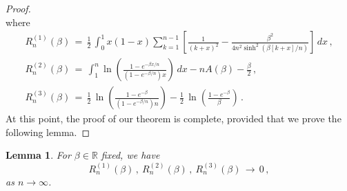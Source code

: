 \documentclass[12pt]{report}
\newtheorem{lemma}[theorem]{Lemma}
\theoremstyle{definition}
\begin{document}
\begin{proof}
$$$$
where
\begin{gather*}
R_n^{(1)}(\beta)\, =\, \frac{1}{2}\,\int_0^1 x(1-x)  \sum_{k=1}^{n-1} \left[\frac{1}{(k+x)^2} - \frac{\beta^2}{4 n^2 \sinh^2(\beta[k+x]/n)}\right]\, dx\, ,\\
R_n^{(2)}(\beta)\, 
=\, \int_1^n \ln\left(\frac{1-e^{-\beta x/n}}{(1-e^{-\beta/n})x}\right)\, dx - n A(\beta) - \frac{\beta}{2}\, ,\\
R_n^{(3)}(\beta)\, 
=\,  \frac{1}{2}\, \ln\left(\frac{1-e^{-\beta}}{(1-e^{-\beta/n})n}\right) - \frac{1}{2}\, \ln\left( \frac{1-e^{-\beta}}{\beta} \right)\, .
\end{gather*}
At this point, the proof of our theorem is complete, provided that we prove the following lemma.
\end{proof}

\begin{lemma}
For $\beta \in \mathbb{R}$ fixed, we have
$$
R_n^{(1)}(\beta)\, ,\ R_n^{(2)}(\beta)\, ,\ R_n^{(3)}(\beta)\, \to\, 0\, ,
$$
as $n \to \infty$.
\end{lemma}
\end{document}
